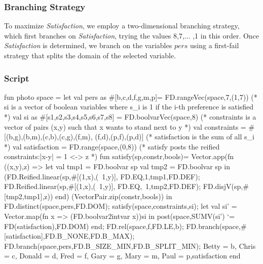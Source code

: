 \documentclass[a4paper,halfparskip]{scrartcl}
\begin{document}
\subsubsection{Branching Strategy}
To maximize \emph{Satisfaction}, we employ a two-dimensional branching 
strategy, which first branches on \emph{Satisfaction}, trying the values 
8,7,$ \ldots $ ,1 in this order. Once \emph{Satisfaction} is determined, we 
branch on the variables $pers$ using a first-fail strategy that splits 
the domain of the selected variable.

\subsubsection{Script}
\begin{myverbatim}
fun photo space =
   let 
       val pers as #[b,c,d,f,g,m,p]= FD.rangeVec(space,7,(1,7))
      (* si is a vector of boolean variables where s_i is 1 
         if the i-th preference is satisfied *)
       val si as #[s1,s2,s3,s4,s5,s6,s7,s8] = FD.boolvarVec(space,8)
      (* constraints is a vector of pairs (x,y) such that x wants to
         stand next to y *)
       val constraints = #[(b,g),(b,m),(c,b),(c,g),(f,m),
                           (f,d),(p,f),(p,d)]
      (* satisfaction is the sum of all s_i *)
       val satisfaction = FD.range(space,(0,8))
      (* satisfy posts the reified constraints:|x-y| = 1 <-> z *)
       fun satisfy(sp,constr,bools)= Vector.app(fn ((x,y),z) =>
              let
                  val tmp1 = FD.boolvar sp
                  val tmp2 = FD.boolvar sp
              in
                 (FD.Reified.linear(sp,#[(1,x),(~1,y)],
                                    FD.EQ,1,tmp1,FD.DEF);
                  FD.Reified.linear(sp,#[(1,x),(~1,y)],
                                    FD.EQ,~1,tmp2,FD.DEF);
                  FD.disjV(sp,#[tmp2,tmp1],z))
              end)
                 (VectorPair.zip(constr,bools))
   in
       FD.distinct(space,pers,FD.DOM);
       satisfy(space,constraints,si);
       let 
           val si' = Vector.map(fn x => (FD.boolvar2intvar x))si
       in
           post(space,SUMV(si') `= FD(satisfaction),FD.DOM)
       end;
       FD.rel(space,f,FD.LE,b);
       FD.branch(space,#[satisfaction],FD.B_NONE,FD.B_MAX);
       FD.branch(space,pers,FD.B_SIZE_MIN,FD.B_SPLIT_MIN);
      {Betty = b, Chris = c, Donald = d, Fred = f,
       Gary = g, Mary = m, Paul = p,satisfaction}  
  end
\end{myverbatim}
\end{document}
